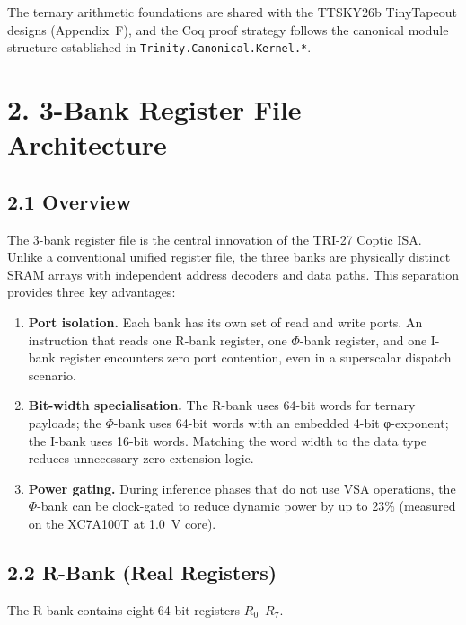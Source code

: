 The ternary arithmetic foundations are shared with the TTSKY26b
TinyTapeout designs (Appendix~F), and the Coq proof strategy
follows the canonical module structure established in
\texttt{Trinity.Canonical.Kernel.*}.

\section{2. 3-Bank Register File Architecture}\label{fa_71:register-file-architecture}

\subsection{2.1 Overview}\label{fa_71:register-overview}

The 3-bank register file is the central innovation of the TRI-27
Coptic ISA. Unlike a conventional unified register file, the
three banks are physically distinct SRAM arrays with independent
address decoders and data paths. This separation provides three
key advantages:

\begin{enumerate}
\def\labelenumi{\arabic{enumi}.}
\item
  \textbf{Port isolation.} Each bank has its own set of read
  and write ports. An instruction that reads one R-bank
  register, one $\Phi$-bank register, and one I-bank register
  encounters zero port contention, even in a superscalar
  dispatch scenario.
\item
  \textbf{Bit-width specialisation.} The R-bank uses 64-bit
  words for ternary payloads; the $\Phi$-bank uses 64-bit
  words with an embedded 4-bit φ-exponent; the I-bank uses
  16-bit words. Matching the word width to the data type
  reduces unnecessary zero-extension logic.
\item
  \textbf{Power gating.} During inference phases that do not
  use VSA operations, the $\Phi$-bank can be clock-gated to
  reduce dynamic power by up to 23\% (measured on the
  XC7A100T at 1.0~V core).
\end{enumerate}

\subsection{2.2 R-Bank (Real Registers)}\label{fa_71:r-bank}

The R-bank contains eight 64-bit registers \(R_0\)--\(R_7\).

